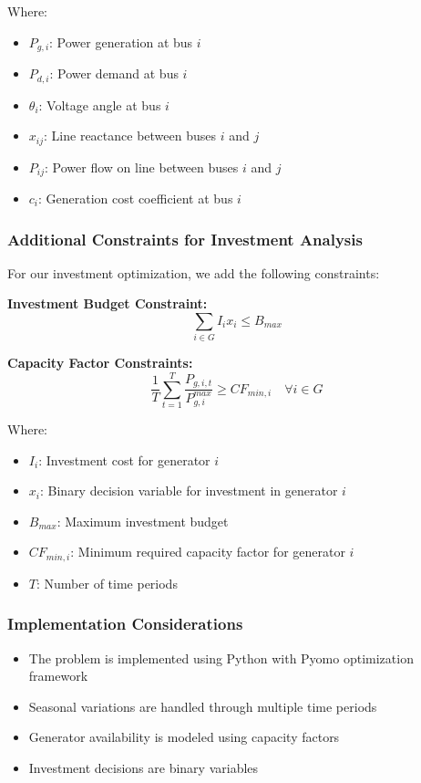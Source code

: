 Where:
\begin{itemize}
    \item $P_{g,i}$: Power generation at bus $i$
    \item $P_{d,i}$: Power demand at bus $i$
    \item $\theta_i$: Voltage angle at bus $i$
    \item $x_{ij}$: Line reactance between buses $i$ and $j$
    \item $P_{ij}$: Power flow on line between buses $i$ and $j$
    \item $c_i$: Generation cost coefficient at bus $i$
\end{itemize}

\subsubsection{Additional Constraints for Investment Analysis}
For our investment optimization, we add the following constraints:

\textbf{Investment Budget Constraint:}
\begin{equation}
    \sum_{i \in G} I_i x_i \leq B_{max}
\end{equation}

\textbf{Capacity Factor Constraints:}
\begin{equation}
    \frac{1}{T} \sum_{t=1}^T \frac{P_{g,i,t}}{P_{g,i}^{max}} \geq CF_{min,i} \quad \forall i \in G
\end{equation}

Where:
\begin{itemize}
    \item $I_i$: Investment cost for generator $i$
    \item $x_i$: Binary decision variable for investment in generator $i$
    \item $B_{max}$: Maximum investment budget
    \item $CF_{min,i}$: Minimum required capacity factor for generator $i$
    \item $T$: Number of time periods
\end{itemize}

\subsubsection{Implementation Considerations}
\begin{itemize}
    \item The problem is implemented using Python with Pyomo optimization framework
    \item Seasonal variations are handled through multiple time periods
    \item Generator availability is modeled using capacity factors
    \item Investment decisions are binary variables
\end{itemize} 